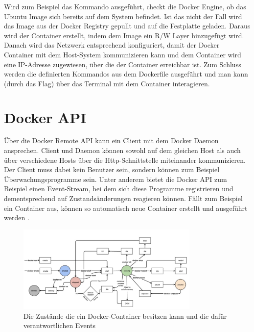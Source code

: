 \noindent Wird zum Beispiel das Kommando  ausgeführt, checkt die Docker Engine, ob das Ubuntu Image sich bereits auf dem System befindet. Ist das nicht der Fall wird das Image aus der Docker Registry gepullt und auf die Festplatte geladen. Daraus wird der Container erstellt, indem dem Image ein R/W Layer hinzugefügt wird. Danach wird das Netzwerk entsprechend konfiguriert, damit der Docker Container mit dem Host-System kommunizieren kann und dem Container wird eine IP-Adresse zugewiesen, über die der Container erreichbar ist. Zum Schluss werden die definierten Kommandos aus dem Dockerfile ausgeführt und man kann (durch das  Flag) über das Terminal mit dem Container interagieren.


\section{Docker API}
Über die Docker Remote API kann ein Client mit dem Docker Daemon ansprechen. Client und Daemon können sowohl auf dem gleichen Host als auch über verschiedene Hosts über die Http-Schnittstelle miteinander kommunizieren. Der Client muss dabei kein Benutzer sein, sondern können zum Beispiel Überwachungsprogramme sein. Unter anderem bietet die Docker API zum Beispiel einen Event-Stream, bei dem sich diese Programme registrieren und dementsprechend auf Zustandsänderungen reagieren können. Fällt zum Beispiel ein Container aus, können so automatisch neue Container erstellt und ausgeführt werden \cite{docker:api}.\\

\begin{figure}[!ht]
  \centering
  \includegraphics[width=0.8\textwidth]{images/docker-api.jpg}
  \caption{Die Zustände die ein Docker-Container besitzen kann und die dafür verantwortlichen Events \cite{docker:api}}
\end{figure}

